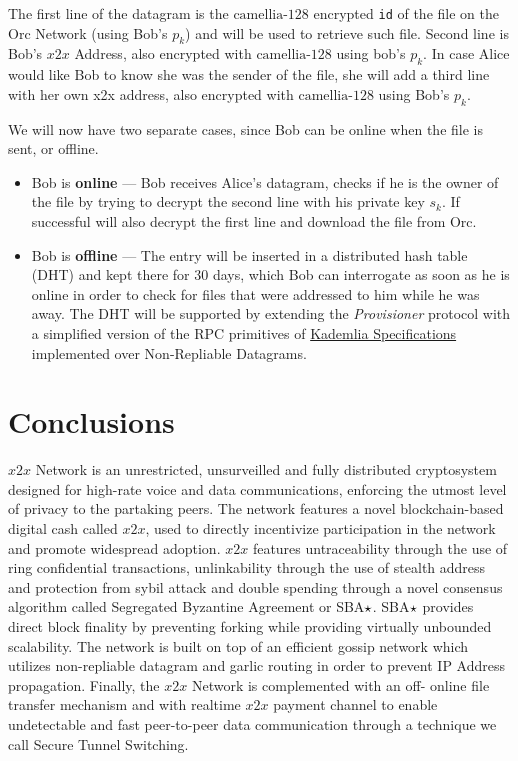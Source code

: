The first line of the datagram is the \(\textrm{camellia-128}\)
encrypted \texttt{id} of the file on the Orc Network (using Bob's
\(p_k\)) and will be used to retrieve such file. Second line is Bob's
\(x2x\) Address, also encrypted with \(\textrm{camellia-128}\) using
bob's \(p_k\). In case Alice would like Bob to know she was the sender
of the file, she will add a third line with her own x2x address, also
encrypted with \(\text{camellia-128}\) using Bob's \(p_k\).

We will now have two separate cases, since Bob can be online when the
file is sent, or offline.

\begin{itemize}
\item
  Bob is \textbf{online} --- Bob receives Alice's datagram, checks if he
  is the owner of the file by trying to decrypt the second line with his
  private key \(s_k\). If successful will also decrypt the first line
  and download the file from Orc.
\item
  Bob is \textbf{offline} --- The entry will be inserted in a
  distributed hash table (DHT) and kept there for 30 days, which Bob can
  interrogate as soon as he is online in order to check for files that
  were addressed to him while he was away. The DHT will be supported by
  extending the \emph{Provisioner} protocol with a simplified version of
  the RPC primitives of
  \href{http://xlattice.sourceforge.net/components/protocol/kademlia/specs.html\#protocol}{Kademlia
  Specifications} implemented over Non-Repliable Datagrams.
\end{itemize}


\section{Conclusions}

$x2x$ Network is an unrestricted, unsurveilled and fully distributed cryptosystem designed for high-rate voice and data communications, enforcing the utmost level of privacy to the partaking peers. The network features a novel blockchain-based digital cash called $x2x$, used to directly incentivize participation in the network and promote widespread adoption. $x2x$ features untraceability through the use of ring confidential transactions, unlinkability through the use of stealth address and protection from sybil attack and double spending through a novel consensus algorithm called Segregated Byzantine Agreement or SBA$\large\star$. SBA$\large\star$ provides direct block finality by preventing forking while providing virtually unbounded scalability. The network is built on top of an efficient gossip network which utilizes non-repliable datagram and garlic routing in order to prevent IP Address propagation. Finally, the $x2x$ Network is complemented with an off- online file transfer mechanism and with realtime $x2x$ payment channel to enable undetectable and fast peer-to-peer data communication through a technique we call Secure Tunnel Switching.